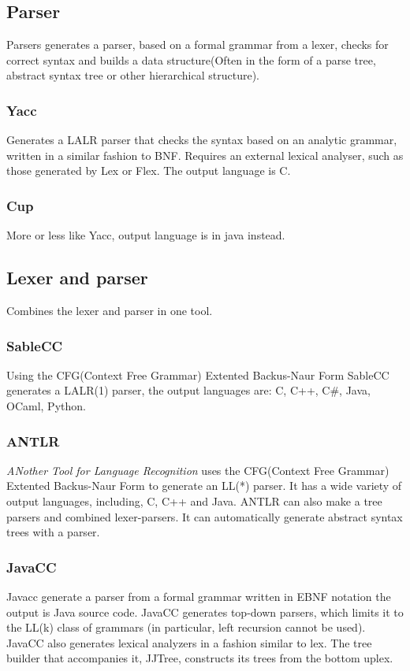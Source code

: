 \subsection{Parser}
Parsers generates a parser, based on a formal grammar from a lexer, checks for correct syntax and builds a data structure(Often in the form of a parse tree, abstract syntax tree or other hierarchical structure). 

\subsubsection{Yacc}
Generates a LALR parser that checks the syntax based on an analytic grammar, written in a similar fashion to BNF. Requires an external lexical analyser, such as those generated by Lex or Flex. The output language is C. \citep{Yacc}

\subsubsection{Cup}
More or less like Yacc, output language is in java instead. \citep{CUP}

\subsection{Lexer and parser}
Combines the lexer and parser in one tool.

\subsubsection{SableCC}
Using the CFG(Context Free Grammar) Extented Backus-Naur Form SableCC generates a LALR(1) parser, the output languages are: C, C++, C\#, Java, OCaml, Python.

\subsubsection{ANTLR}
\textit{ANother Tool for Language Recognition} uses the CFG(Context Free Grammar) Extented Backus-Naur Form to generate an LL(*) parser. It has a wide variety of output languages, including, C, C++ and Java.
ANTLR can also make a tree parsers and combined lexer-parsers. It can automatically generate abstract syntax trees with a parser. \citep{ANTLR} %


\subsubsection{JavaCC}
Javacc generate a parser from a formal grammar written in EBNF notation the output is Java source code. JavaCC generates top-down parsers, which limits it to the LL(k) class of grammars (in particular, left recursion cannot be used). JavaCC also generates lexical analyzers in a fashion similar to lex\citep{Javacc}. The tree builder that accompanies it, JJTree, constructs its trees from the bottom uplex\citep{JJTree}.


